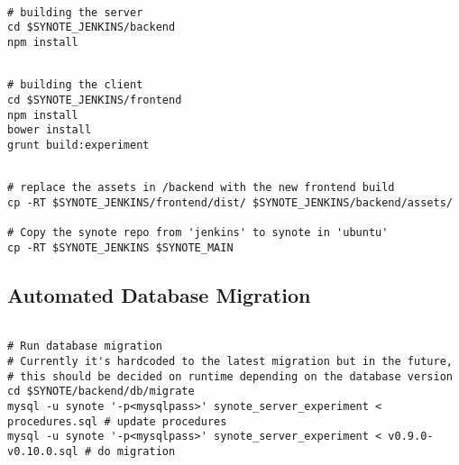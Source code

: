 \begin{listing}[H]
\begin{verbatim}

# building the server
cd $SYNOTE_JENKINS/backend
npm install

\end{verbatim}
\label{lst:building-synote-server}
\end{listing}

\begin{listing}[H]
\begin{verbatim}

# building the client
cd $SYNOTE_JENKINS/frontend
npm install
bower install
grunt build:experiment

\end{verbatim}
\label{lst:building-synote-client}
\end{listing}

\begin{listing}[H]
\begin{verbatim}

# replace the assets in /backend with the new frontend build
cp -RT $SYNOTE_JENKINS/frontend/dist/ $SYNOTE_JENKINS/backend/assets/

# Copy the synote repo from 'jenkins' to synote in 'ubuntu'
cp -RT $SYNOTE_JENKINS $SYNOTE_MAIN

\end{verbatim}
\label{lst:replace current deployment source}
\end{listing}

\subsection{Automated Database Migration}
\label{subsec:automated-database-migration}

\begin{listing}[H]
\begin{verbatim}

# Run database migration
# Currently it's hardcoded to the latest migration but in the future,
# this should be decided on runtime depending on the database version
cd $SYNOTE/backend/db/migrate
mysql -u synote '-p<mysqlpass>' synote_server_experiment < procedures.sql # update procedures
mysql -u synote '-p<mysqlpass>' synote_server_experiment < v0.9.0-v0.10.0.sql # do migration

\end{verbatim}
\label{lst:automated-db-migration}
\end{listing}

